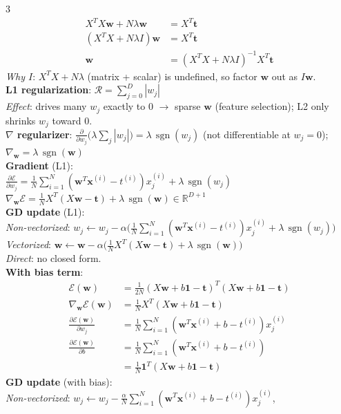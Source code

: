 \documentclass[10pt]{article}
\newcommand{\vx}{\mathbf{x}}
\newcommand{\vw}{\mathbf{w}}
\newcommand{\vt}{\mathbf{t}}
\newcommand{\cE}{\mathcal{E}}
\newcommand{\sub}[1]{\textit{#1}:}  %
\begin{document}
\begin{multicols*}{3}
\begin{align*}
X^TX\vw+N\lambda\vw&=X^T\vt\\
(X^TX+N\lambda I)\vw&=X^T\vt\\
\vw&=(X^TX+N\lambda I)^{-1}X^T\vt
\end{align*}
\sub{Why $I$} $X^TX+N\lambda$ (matrix + scalar) is undefined, so factor $\vw$ out as $I\vw$.\\
\textbf{L1 regularization}: $\mathcal R=\textstyle\sum_{j=0}^D|w_j|$\\
\sub{Effect} drives many $w_j$ exactly to 0 $\to$ sparse $\vw$ (feature selection); L2 only shrinks $w_j$ toward 0.\\
\textbf{$\nabla$ regularizer}: $\frac{\partial}{\partial w_j}\big(\lambda\sum_j|w_j|\big)=\lambda\,\operatorname{sgn}(w_j)$ (not differentiable at $w_j=0$); $\nabla_\vw=\lambda\,\operatorname{sgn}(\vw)$\\
\textbf{Gradient} (L1):\\
$\frac{\partial\cE}{\partial w_j}=\frac1N\sum_{i=1}^N(\vw^T\vx^{(i)}-t^{(i)})x_j^{(i)}+\lambda\,\operatorname{sgn}(w_j)$\\
$\nabla_\vw\cE=\frac1NX^T(X\vw-\vt)+\lambda\,\operatorname{sgn}(\vw)\in\mathbb R^{D+1}$\\
\textbf{GD update} (L1):\\
\sub{Non-vectorized} $w_j\leftarrow w_j-\alpha\big(\frac1N\sum_{i=1}^N(\vw^T\vx^{(i)}-t^{(i)})x_j^{(i)}+\lambda\,\operatorname{sgn}(w_j)\big)$\\
\sub{Vectorized} $\vw\leftarrow\vw-\alpha\big(\frac1NX^T(X\vw-\vt)+\lambda\,\operatorname{sgn}(\vw)\big)$\\
\sub{Direct} no closed form.\\
\textbf{With bias term}:
\begin{align*}
\cE(\vw) &= \frac{1}{2N}(X\vw+b\mathbf 1-\vt)^T(X\vw+b\mathbf 1-\vt)\\
\nabla_{\vw}\cE(\vw) &= \frac{1}{N}X^T(X\vw+b\mathbf 1-\vt)\\
\frac{\partial\cE(\vw)}{\partial w_j} &= \frac{1}{N}\sum_{i=1}^N\left(\vw^T\vx^{(i)}+b-t^{(i)}\right)x_j^{(i)}\\
\frac{\partial\cE(\vw)}{\partial b} &= \frac{1}{N}\sum_{i=1}^N\left(\vw^T\vx^{(i)}+b-t^{(i)}\right)\\
&= \frac{1}{N}\mathbf 1^T(X\vw+b\mathbf 1-\vt)
\end{align*}
\textbf{GD update} (with bias):\\
\sub{Non-vectorized} $w_j\leftarrow w_j-\frac{\alpha}{N}\sum_{i=1}^N(\vw^T\vx^{(i)}+b-t^{(i)})x_j^{(i)}$,\\

\end{multicols*}
\end{document}
